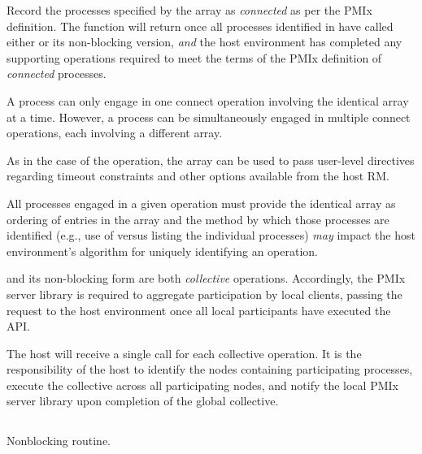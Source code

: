 \descr

Record the processes specified by the  array as \textit{connected} as per the \ac{PMIx} definition. The function will return once all processes identified in  have called either  or its non-blocking version, \textit{and} the host environment has completed any supporting operations required to meet the terms of the \ac{PMIx} definition of \textit{connected} processes.

A process can only engage in one connect operation involving the identical  array at a time.
However, a process can be simultaneously engaged in multiple connect operations, each involving a different  array.

As in the case of the  operation, the  array can be used to pass user-level directives regarding timeout constraints and other options available from the host \ac{RM}.

\adviceuserstart
All processes engaged in a given  operation must provide the identical  array as ordering of entries in the array and the method by which those processes are identified (e.g., use of  versus listing the individual processes) \textit{may} impact the host environment's algorithm for uniquely identifying an operation.
\adviceuserend

\adviceimplstart
{} and its non-blocking form are both \emph{collective} operations. Accordingly, the \ac{PMIx} server library is required to aggregate participation by local clients, passing the request to the host environment once all local participants have executed the \ac{API}.
\adviceimplend

\advicermstart
The host will receive a single call for each collective operation. It is the responsibility of the host to identify the nodes containing participating processes, execute the collective across all participating nodes, and notify the local \ac{PMIx} server library upon completion of the global collective.
\advicermend


\subsection{}

\summary

Nonblocking  routine.

